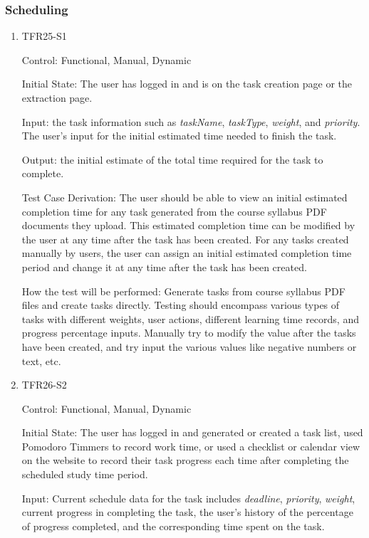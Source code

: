 \documentclass[12pt, titlepage]{article}
\begin{document}
\subsubsection{Scheduling}
\begin{enumerate}

  \item{TFR25-S1\\} \label{TFR25-S1}

  Control: Functional, Manual, Dynamic
            
  Initial State: The user has logged in and is on the task creation page or the extraction page.
            
  Input: the task information such as \textit{taskName}, \textit{taskType}, \textit{weight}, and \textit{priority}. The user's input for the initial estimated time needed to finish the task.
            
  Output: the initial estimate of the total time required for the task to complete.
  
  Test Case Derivation: The user should be able to view an initial estimated completion time for any task generated from the course syllabus PDF documents they upload. This estimated completion time can be modified by the user at any time after the task has been created. For any tasks created manually by users, the user can assign an initial estimated completion time period and change it at any time after the task has been created. 
            
  How the test will be performed:
  Generate tasks from course syllabus PDF files and create tasks directly. Testing should encompass various types of tasks with different weights, user actions, different learning time records, and progress percentage inputs. Manually try to modify the value after the tasks have been created, and try input the various values like negative numbers or text, etc.

\item{TFR26-S2\\} \label{TFR26-S2}

Control: Functional, Manual, Dynamic
					
Initial State: The user has logged in and generated or created a task list, used Pomodoro Timmers to record work time, or used a checklist or calendar view on the website to record their task progress each time after completing the scheduled study time period.
					
Input: Current schedule data for the task includes \textit{deadline}, \textit{priority}, \textit{weight}, current progress in completing the task, the user's history of the percentage of progress completed, and the corresponding time spent on the task.
					

\end{enumerate}
\end{document}
